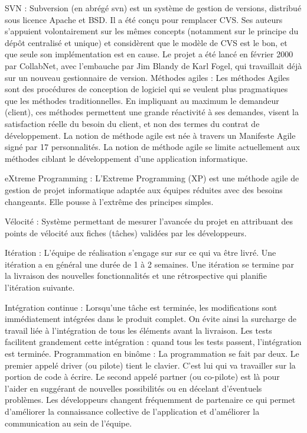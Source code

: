 SVN : Subversion (en abrégé svn) est un système de gestion de versions, distribué sous licence Apache et BSD. Il a été conçu pour remplacer CVS. Ses auteurs s'appuient volontairement sur les mêmes concepts (notamment sur le principe du dépôt centralisé et unique) et considèrent que le modèle de CVS est le bon, et que seule son implémentation est en cause. Le projet a été lancé en février 2000 par CollabNet, avec l'embauche par Jim Blandy de Karl Fogel, qui travaillait déjà sur un nouveau gestionnaire de version. 
Méthodes agiles : Les méthodes Agiles sont des procédures de conception de logiciel qui se veulent plus pragmatiques que les méthodes traditionnelles. En impliquant au maximum le demandeur (client), ces méthodes permettent une grande réactivité à ses demandes, visent la satisfaction réelle du besoin du client, et non des termes du contrat de développement. La notion de méthode agile est née à travers un Manifeste Agile signé par 17 personnalités. La notion de méthode agile se limite actuellement aux méthodes ciblant le développement d'une application informatique.

eXtreme Programming : L'Extreme Programming (XP) est une méthode agile de gestion de projet informatique adaptée aux équipes réduites avec des besoins changeants. Elle pousse à l'extrême des principes simples. 

Vélocité : Système permettant de mesurer l'avancée du projet en attribuant des points de vélocité aux fiches (tâches) validées par les développeurs.

Itération : L'équipe de réalisation s'engage sur sur ce qui va être livré. Une itération a en général une durée de 1 à 2 semaines. Une itération se termine par la livraison des nouvelles fonctionnalités et une rétrospective qui planifie l'itération suivante.

Intégration continue : Lorsqu'une tâche est terminée, les modifications sont immédiatement intégrées dans le produit complet. On évite ainsi la surcharge de travail liée à l'intégration de tous les éléments avant la livraison. Les tests facilitent grandement cette intégration : quand tous les tests passent, l'intégration est terminée. 
Programmation en binôme : La programmation se fait par deux. Le premier appelé driver (ou pilote) tient le clavier. C'est lui qui va travailler sur la portion de code à écrire. Le second appelé partner (ou co-pilote) est là pour l'aider en suggérant de nouvelles possibilités ou en décelant d'éventuels problèmes. Les développeurs changent fréquemment de partenaire ce qui permet d'améliorer la connaissance collective de l'application et d'améliorer la communication au sein de l'équipe. 

